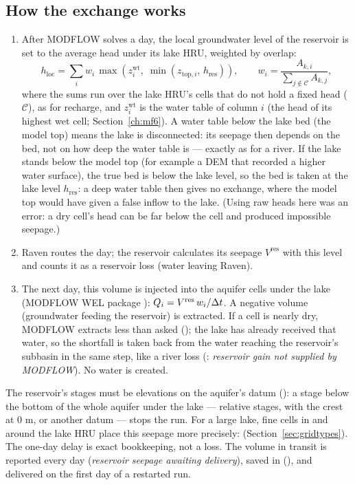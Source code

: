 \subsection{How the exchange works}
\begin{enumerate}
\item After MODFLOW solves a day, the local groundwater level of the reservoir is set to the average head under its
lake HRU, weighted by overlap:
\begin{equation}
h_{\mathrm{loc}}=\sum_iw_i\,\max\!\left(z^{\mathrm{wt}}_i,\;\min\!\left(z_{\mathrm{top},i},\,h_{\mathrm{res}}\right)\right),\qquad w_i=\frac{A_{k,i}}{\sum_{j\notin\mathcal{C}}A_{k,j}} ,
\end{equation}
where the sums run over the lake HRU's cells that do not hold a fixed head ($\mathcal{C}$), as for recharge, and
$z^{\mathrm{wt}}_i$ is the water table of column $i$ (the head of its highest wet cell; Section~\ref{ch:mf6}). A water table
below the lake bed (the model top) means the lake is disconnected: its seepage then depends on the bed, not on how deep
the water table is --- exactly as for a river. If the lake stands below the model top (for example a DEM that recorded a
higher water surface), the true bed is below the lake level, so the bed is taken at the lake level $h_{\mathrm{res}}$: a
deep water table then gives no exchange, where the model top would have given a false inflow to the lake. (Using raw heads
here was an error: a dry cell's head can be far below the cell and produced impossible seepage.)
\item Raven routes the day; the reservoir calculates its seepage $V^{\mathrm{res}}$ with this level and counts it as a
reservoir loss (water leaving Raven).
\item The next day, this volume is injected into the aquifer cells under the lake (MODFLOW WEL package
): $Q_i=V^{\mathrm{res}}\,w_i/\Delta t$. A negative volume (groundwater feeding the reservoir) is extracted.
If a cell is nearly dry, MODFLOW extracts less than asked (); the lake has already received that
water, so the shortfall is taken back from the water reaching the reservoir's subbasin in the same step, like a river loss
(: \emph{reservoir gain not supplied by MODFLOW}). No water is created.
\end{enumerate}
The reservoir's stages must be elevations on the aquifer's datum (): a stage below the
bottom of the whole aquifer under the lake --- relative stages, with the crest at 0 m, or another datum --- stops the run.
For a large lake, fine cells in and around the lake HRU place this seepage more precisely: 
(Section~\ref{sec:gridtypes}). The one-day delay is exact bookkeeping, not a loss. The volume in transit is reported every day (\emph{reservoir seepage
awaiting delivery}), saved in  (), and delivered on the first day of a
restarted run.


